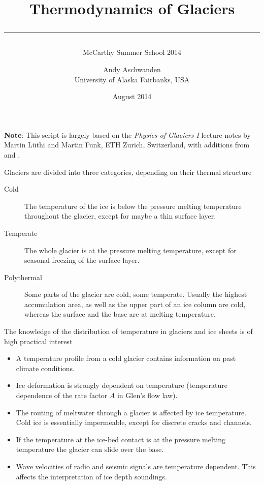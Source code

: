 \documentclass[parskip=half]{scrartcl}
\begin{document}
\title{Thermodynamics of Glaciers\\[.5em]
\rule[1.em]{\textwidth}{2pt}}
\subtitle{McCarthy Summer School 2014}

\date{August 2014}

\author{
  \small Andy Aschwanden\\[-.5em] 
 \small University of Alaska Fairbanks, USA}


\maketitle

{\bf Note}: This script is largely based on the \emph{Physics of
Glaciers I} lecture notes by Martin L\"uthi and Martin Funk, ETH
Zurich, Switzerland, with additions from \cite{GreveBlatter_disg} and
\cite{Gusmeroli2010}.

\vspace{1em}

Glaciers are divided into three categories, depending on their thermal
structure
%
\begin{description}
\item[Cold] The temperature of the ice is below the pressure melting
temperature throughout the glacier, except for maybe a thin surface
layer.
\item[Temperate] The whole glacier is at the pressure melting
temperature, except for seasonal freezing of the surface layer.
\item[Polythermal] Some parts of the glacier are cold, some temperate.
Usually the highest accumulation area, as well as the upper part of an
ice column are cold, whereas the surface and the base are at melting
temperature.
\end{description}
%
The knowledge of the distribution of temperature in glaciers and ice
sheets is of high practical interest
%
\begin{itemize}\itemsep0ex
\item A temperature profile from a cold glacier contains information
on past climate conditions.
\item Ice deformation is strongly dependent on temperature
(temperature dependence of the rate factor $A$ in Glen's flow law).
\item The routing of meltwater through a glacier is affected by ice
temperature.  Cold ice is essentially impermeable, except for discrete
cracks and channels.
\item If the temperature at the ice-bed contact is at the pressure
melting temperature the glacier can slide over the base.
\item Wave velocities of radio and seismic signals are temperature
dependent. This affects the interpretation of ice depth soundings.
\end{itemize}
\end{document}
